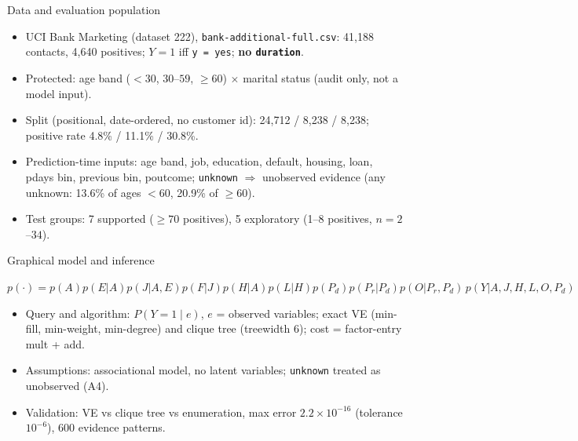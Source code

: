 \documentclass[aspectratio=169,11pt]{beamer}
\begin{document}
\begin{frame}{Data and evaluation population}
\begin{itemize}
\item UCI Bank Marketing (dataset 222), \texttt{bank-additional-full.csv}: 41,188 contacts, 4,640 positives; $Y=1$ iff \texttt{y = yes}; \textbf{no \texttt{duration}}.
\item Protected: age band ($<30$, $30$--$59$, $\ge60$) $\times$ marital status (audit only, not a model input).
\item Split (positional, date-ordered, no customer id): 24,712 / 8,238 / 8,238; positive rate 4.8\% / 11.1\% / 30.8\%.
\item Prediction-time inputs: age band, job, education, default, housing, loan, pdays bin, previous bin, poutcome; \texttt{unknown} $\Rightarrow$ unobserved evidence (any unknown: 13.6\% of ages $<60$, 20.9\% of $\ge60$).
\item Test groups: 7 supported ($\ge70$ positives), 5 exploratory (1--8 positives, $n=2$--$34$).
\end{itemize}
\end{frame}

\begin{frame}{Graphical model and inference}
\begin{center}\end{center}
\vspace{-2mm}
\centerline{\small $p(\cdot)=p(A)p(E|A)p(J|A,E)p(F|J)p(H|A)p(L|H)p(P_d)p(P_r|P_d)p(O|P_r,P_d)\,p(Y|A,J,H,L,O,P_d)$}
\begin{itemize}\footnotesize
\item Query and algorithm: $P(Y{=}1\mid e)$, $e$ = observed variables; exact VE (min-fill, min-weight, min-degree) and clique tree (treewidth 6); cost = factor-entry mult + add.
\item Assumptions: associational model, no latent variables; \texttt{unknown} treated as unobserved (A4).
\item Validation: VE vs clique tree vs enumeration, max error $2.2\times10^{-16}$ (tolerance $10^{-6}$), 600 evidence patterns.
\end{itemize}
\end{frame}
\end{document}
